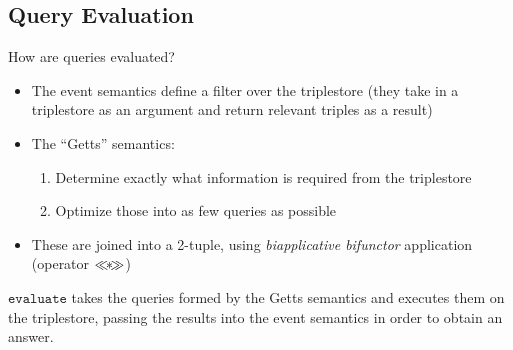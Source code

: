 \documentclass[logoontitle,tabu,supertabular,aspectratio=43]{preney-uwindsor-beamer}
\begin{document}
    \newcommand\biapply{\ensuremath{\mathbin{\ll\mkern-8mu*\mkern-8mu\gg}}}
    \subsection{Query Evaluation}
    \begin{frame}{\insertsubsection}
        How are queries evaluated?
        \begin{itemize}
            \item The event semantics define a filter over the triplestore (they take in a triplestore as an argument and return relevant triples as a result)
            \item The ``Getts'' semantics:
            \begin{enumerate}
                \item Determine exactly what information is required from the triplestore%
                \item Optimize those into as few queries as possible
            \end{enumerate}
            \item These are joined into a 2-tuple, using {\em biapplicative bifunctor} application (operator $\biapply$)
        \end{itemize}
        \begin{block}{}
            $\mathtt{evaluate}$ takes the queries formed by the Getts semantics and executes them on the triplestore, passing the results into the event semantics in order to obtain an answer.
        \end{block}
    \end{frame}
\end{document}

